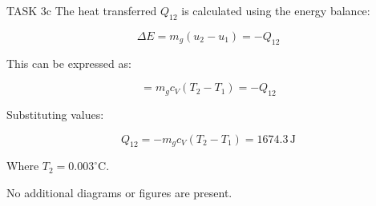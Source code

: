 TASK 3c  
The heat transferred \( Q_{12} \) is calculated using the energy balance:  

\[
\Delta E = m_g (u_2 - u_1) = -Q_{12}
\]

This can be expressed as:  

\[
= m_g c_V (T_2 - T_1) = -Q_{12}
\]

Substituting values:  

\[
Q_{12} = -m_g c_V (T_2 - T_1) = 1674.3 \, \text{J}
\]

Where \( T_2 = 0.003^\circ\text{C} \).  

No additional diagrams or figures are present.